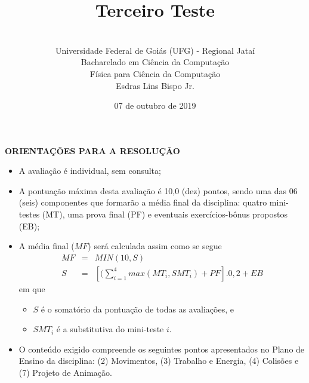 \documentclass[12pt,a4paper,oneside]{article}
\author{\\Universidade Federal de Goiás (UFG) - Regional Jataí\\Bacharelado em Ciência da Computação \\Física para Ciência da Computação \\Esdras Lins Bispo Jr.}
\title{\sc \huge Terceiro Teste}
\date{07 de outubro de 2019}
\begin{document}
\maketitle

{\bf ORIENTAÇÕES PARA A RESOLUÇÃO}

\footnotesize

\begin{itemize}
	\item A avaliação é individual, sem consulta;
	\item A pontuação máxima desta avaliação é 10,0 (dez) pontos, sendo uma das 06 (seis) componentes que formarão a média final da disciplina: quatro mini-testes (MT), uma prova final (PF) e eventuais exercícios-bônus propostos (EB);
	\item A média final ($MF$) será calculada assim como se segue
	\begin{eqnarray}
	MF & = & MIN(10, S) \nonumber \\
	S & = & [(\sum_{i=1}^{4} max(MT_i, SMT_i ) + PF].0,2  + EB \nonumber
	\end{eqnarray}
	em que 
	\begin{itemize}
		\item $S$ é o somatório da pontuação de todas as avaliações, e
		\item $SMT_i$ é a substitutiva do mini-teste $i$.
	\end{itemize}
	\item O conteúdo exigido compreende os seguintes pontos apresentados no Plano de Ensino da disciplina: (2) Movimentos, (3) Trabalho e Energia, (4) Colisões e (7) Projeto de Animação.
\end{itemize}


\begin{center}
\end{center}

\newpage

\normalsize
\end{document}
